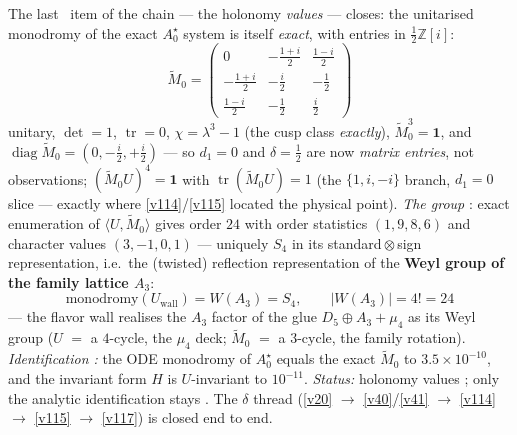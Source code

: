 \documentclass[11pt,a4paper]{article}
\newcommand{\Z}{\mathbb Z}
\begin{document}
\begin{keybox}
The last \mE\ item of the chain --- the holonomy \emph{values} --- closes: the unitarised monodromy of
the exact $A_0^\star$ system is itself \emph{exact}, with entries in $\tfrac12\Z[i]$:
\[
  \boxed{\ \widetilde M_0=\begin{pmatrix}0&-\tfrac{1+i}2&\tfrac{1-i}2\\[2pt]
  -\tfrac{1+i}2&-\tfrac i2&-\tfrac12\\[2pt]
  \tfrac{1-i}2&-\tfrac12&\tfrac i2\end{pmatrix}\ }
\]
unitary, $\det=1$, $\operatorname{tr}=0$, $\chi=\lambda^3-1$ (the cusp class \emph{exactly}),
$\widetilde M_0^3=\mathbf1$, and $\operatorname{diag}\widetilde M_0=(0,-\tfrac i2,+\tfrac i2)$ --- so
$d_1=0$ and $\delta=\tfrac12$ are now \emph{matrix entries}, not observations; $(\widetilde M_0U)^4=\mathbf1$
with $\operatorname{tr}(\widetilde M_0U)=1$ (the $\{1,i,-i\}$ branch, $d_1=0$ slice --- exactly where
\vref{v114}/\vref{v115} located the physical point). \emph{The group} \mE: exact enumeration of
$\langle U,\widetilde M_0\rangle$ gives order $24$ with order statistics $(1,9,8,6)$ and character
values $(3,-1,0,1)$ --- uniquely $S_4$ in its standard${}\otimes{}$sign representation, i.e.\ the
(twisted) reflection representation of the \textbf{Weyl group of the family lattice $A_3$}:
\[
  \boxed{\ \text{monodromy}(U_{\mathrm{wall}})=W(A_3)=S_4,\qquad |W(A_3)|=4!=24\ }
\]
--- the flavor wall realises the $A_3$ factor of the glue $D_5\oplus A_3+\mu_4$ as its Weyl group ($U$
$=$ a $4$-cycle, the $\mu_4$ deck; $\widetilde M_0$ $=$ a $3$-cycle, the family rotation).
\emph{Identification \mE:} the ODE monodromy of $A_0^\star$ equals the exact $\widetilde M_0$ to
$3.5\times10^{-10}$, and the invariant form $H$ is $U$-invariant to $10^{-11}$. \emph{Status:} holonomy
values \mE; only the analytic identification stays \mE. The $\delta$ thread
(\vref{v20} $\to$ \vref{v40}/\vref{v41} $\to$ \vref{v114} $\to$ \vref{v115} $\to$ \vref{v117}) is closed end to end.
\end{keybox}
\end{document}
